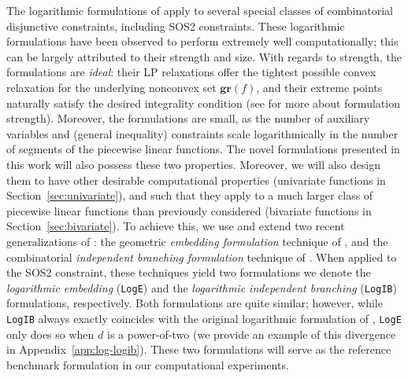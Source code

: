 \documentclass[opre,nonblindrev]{informs3} %
\newcommand{\bbR}{\mathbb{R}}
\newcommand{\calT}{\mathcal{T}}
\newcommand{\gr}{\textbf{gr}}
\newcommand{\Log}{\texttt{LogE}}
\newcommand{\LogIB}{\texttt{LogIB}}
\begin{document}
The logarithmic formulations of \cite{Vielma:2009a} apply to several special classes of combinatorial disjunctive constraints, including SOS2 constraints. These logarithmic formulations have been observed to perform extremely well computationally; this can be largely attributed to their strength and size. With regards to strength, the formulations are \emph{ideal}: their LP relaxations offer the tightest possible convex relaxation for the underlying nonconvex set $\gr(f)$, and their extreme points naturally satisfy the desired integrality condition (see \cite{Vielma:2015} for more about formulation strength). Moreover, the formulations are small, as the number of auxiliary variables and (general inequality) constraints scale logarithmically in the number of segments of the piecewise linear functions. The novel formulations presented in this work will also possess these two properties. Moreover, we will also design them to have other desirable computational properties (univariate functions in Section~\ref{sec:univariate}), and such that they apply to a much larger class of piecewise linear functions than previously considered (bivariate functions in Section~\ref{sec:bivariate}).  To achieve this, we use and extend two recent generalizations of \cite{Vielma:2009a}: the geometric \emph{embedding formulation} technique of \cite{Vielma:2016}, and the combinatorial \emph{independent branching formulation} technique of  \cite{Huchette:2016a}. When applied to the SOS2 constraint, these techniques yield two formulations we denote the \emph{logarithmic embedding} (\Log{}) and the \emph{logarithmic independent branching} (\LogIB{}) formulations, respectively. Both formulations are quite similar; however, while \LogIB{} always exactly coincides with the original logarithmic formulation of \cite{Vielma:2009a}, \Log{} only does so when $d$ is a power-of-two \citep{Muldoon:2012} (we provide an example of this divergence in Appendix~\ref{app:log-logib}). These two formulations will serve as the reference benchmark formulation in our computational experiments.





%
%
%
\end{document}

